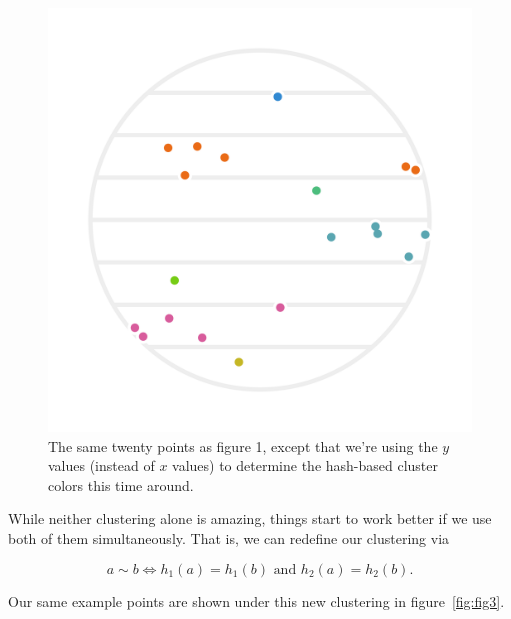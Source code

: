 \documentclass[20pt,]{extarticle}
\begin{document}
\begin{figure}
\centering
\includegraphics{images/pdfs/lsh_image2.pdf}
\caption{The same twenty points as figure 1, except that we're using the
\(y\) values (instead of \(x\) values) to determine the hash-based
cluster colors this time around.}\label{fig:fig2}
\end{figure}

While neither clustering alone is amazing, things start to work better
if we use both of them simultaneously. That is, we can redefine our
clustering via

\begin{equation} a \sim b \iff h_1(a) = h_1(b) \text{ and } h_2(a) = h_2(b). \label{eq:eq1}\end{equation}

Our same example points are shown under this new clustering in
figure~\ref{fig:fig3}.
\end{document}
